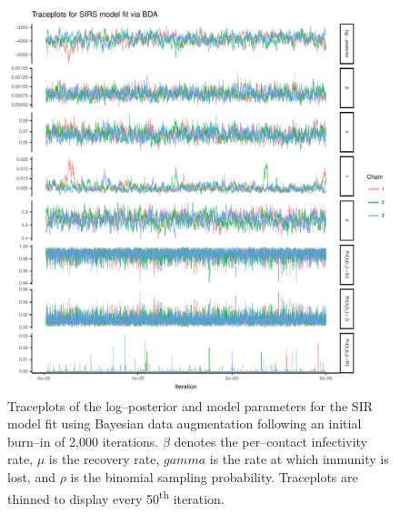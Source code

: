 \begin{figure}[htbp]
	\centering
	\includegraphics[width=0.9\linewidth]{figures/sirs_bda_traceplots}
	\caption{Traceplots of the log--posterior and model parameters for the SIR model fit using Bayesian data augmentation following an initial burn--in of 2,000 iterations. $ \beta $ denotes the per--contact infectivity rate, $ \mu $ is the recovery rate, $ gamma $ is the rate at which immunity is lost, and $ \rho $ is the binomial sampling probability. Traceplots are thinned to display every 50\textsuperscript{th} iteration.}
	\label{fig:sirsbdatraceplots}
\end{figure}

